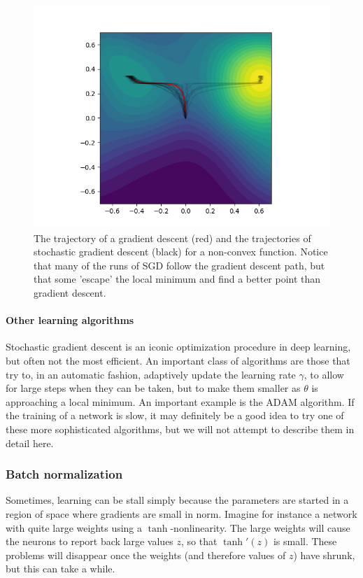 \documentclass{article}
\begin{document}
\begin{figure}
    \centering
    \includegraphics[width=.6\textwidth]{graphics/sgd.png}
    \caption{The trajectory of a gradient descent (red) and the trajectories of stochastic gradient descent (black) for a non-convex function. Notice that many of the runs of SGD follow the gradient descent path, but that some 'escape' the local minimum and find a better point than gradient descent.}
    \label{fig:sgd}
\end{figure}


\paragraph{Other learning algorithms}
Stochastic gradient descent is an iconic optimization procedure in deep learning, but often not the most efficient. An important class of algorithms are those that try to, in an automatic fashion, adaptively update the learning rate $\gamma$, to allow for large steps when they can be taken, but to make them smaller as $\theta$ is approaching a local minimum. An important example is the $\mathrm{ADAM}$ algorithm. If the training of a network is slow, it may definitely be a good idea to try one of these more sophisticated algorithms, but we will not attempt to describe them in detail here.



\subsubsection{Batch normalization} Sometimes, learning can be stall simply because the parameters are started in a region of space where gradients are small in norm. Imagine for instance a network with quite large weights using a $\tanh$-nonlinearity. The large weights will cause the neurons to report back large values $z$, so that $\tanh'(z)$ is small. These problems will disappear once the weights (and therefore values of $z$) have shrunk, but this can take a while.
\end{document}
